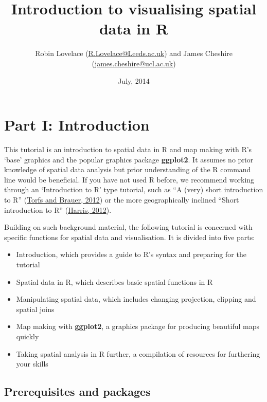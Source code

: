 \documentclass[]{article}
\title{Introduction to visualising spatial data in R}
\author{Robin Lovelace
(\href{mailto:R.Lovelace@Leeds.ac.uk}{R.Lovelace@Leeds.ac.uk}) and James
Cheshire
(\href{mailto:james.cheshire@ucl.ac.uk}{james.cheshire@ucl.ac.uk})}
\date{July, 2014}
\begin{document}
\maketitle


{
\hypersetup{linkcolor=black}
\setcounter{tocdepth}{2}
\tableofcontents
}
\newpage

\section{Part I: Introduction}\label{part-i-introduction}

This tutorial is an introduction to spatial data in R and map making
with R's `base' graphics and the popular graphics package
\textbf{ggplot2}. It assumes no prior knowledge of spatial data analysis
but prior understanding of the R command line would be beneficial. If
you have not used R before, we recommend working through an
`Introduction to R' type tutorial, such as ``A (very) short introduction
to R''
(\href{http://cran.r-project.org/doc/contrib/Torfs+Brauer-Short-R-Intro.pdf}{Torfs
and Brauer, 2012}) or the more geographically inclined ``Short
introduction to R''
(\href{http://www.social-statistics.org/wp-content/uploads/2012/12/intro_to_R1.pdf}{Harris,
2012}).

Building on such background material, the following tutorial is
concerned with specific functions for spatial data and visualisation. It
is divided into five parts:

\begin{itemize}
\itemsep1pt\parskip0pt
\item
  Introduction, which provides a guide to R's syntax and preparing for
  the tutorial
\item
  Spatial data in R, which describes basic spatial functions in R
\item
  Manipulating spatial data, which includes changing projection,
  clipping and spatial joins
\item
  Map making with \textbf{ggplot2}, a graphics package for producing
  beautiful maps quickly
\item
  Taking spatial analysis in R further, a compilation of resources for
  furthering your skills
\end{itemize}

\subsection{Prerequisites and
packages}\label{prerequisites-and-packages}
\end{document}
